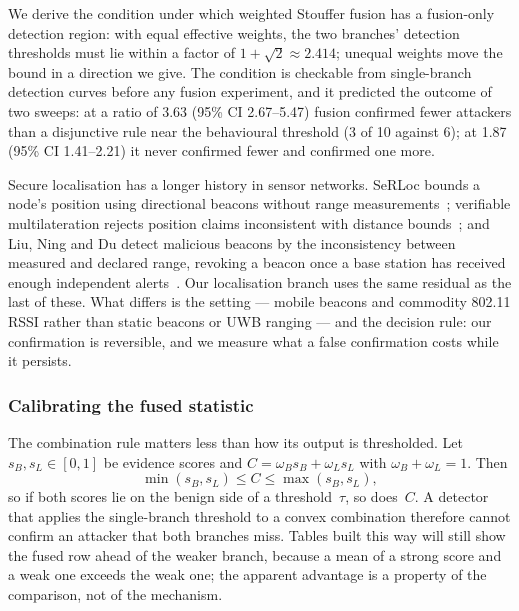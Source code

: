 \item We derive the condition under which weighted Stouffer fusion has a
      fusion-only detection region: with equal effective weights, the two
      branches' detection thresholds must lie within a factor of
      $1+\sqrt{2}\approx 2.414$; unequal weights move the bound in a
      direction we give. The condition is checkable from single-branch
      detection curves before any fusion experiment, and it predicted the
      outcome of two sweeps: at a ratio of 3.63 (95\% CI 2.67--5.47)
      fusion confirmed fewer attackers than a disjunctive rule near the
      behavioural threshold (3 of 10 against 6); at 1.87 (95\% CI
      1.41--2.21) it never confirmed fewer and confirmed one more.


Secure localisation has a longer history in sensor networks. SeRLoc bounds
a node's position using directional beacons without range
measurements~\cite{lazos2004serloc}; verifiable multilateration rejects
position claims inconsistent with distance bounds~\cite{capkun2006secure};
and Liu, Ning and Du detect malicious beacons by the inconsistency between
measured and declared range, revoking a beacon once a base station has
received enough independent alerts~\cite{liu2005detecting}. Our
localisation branch uses the same residual as the last of these. What
differs is the setting --- mobile beacons and commodity 802.11 RSSI rather
than static beacons or UWB ranging --- and the decision rule: our
confirmation is reversible, and we measure what a false confirmation costs
while it persists.


\subsubsection{Calibrating the fused statistic}

The combination rule matters less than how its output is thresholded.
Let $s_B, s_L \in [0,1]$ be evidence scores and $C = \omega_B s_B +
\omega_L s_L$ with $\omega_B + \omega_L = 1$. Then
\begin{equation}
\label{eq:convex}
\min(s_B, s_L) \le C \le \max(s_B, s_L),
\end{equation}
so if both scores lie on the benign side of a threshold~$\tau$, so does~$C$.
A detector that applies the single-branch threshold to a convex combination
therefore cannot confirm an attacker that both branches miss. Tables built
this way will still show the fused row ahead of the weaker branch, because
a mean of a strong score and a weak one exceeds the weak one; the apparent
advantage is a property of the comparison, not of the mechanism.

